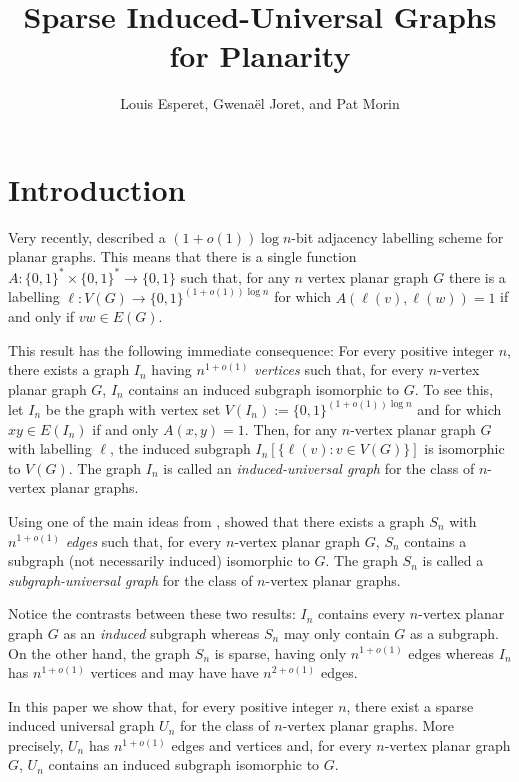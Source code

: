 \documentclass{patmorin}
\title{Sparse Induced-Universal Graphs for Planarity}
\author{Louis Esperet, Gwenaël Joret, and Pat Morin}
\begin{document}
\maketitle

\section{Introduction}

Very recently, \citet{dujmovic.esperet.ea:adjacency} described a $(1+o(1))\log n$-bit adjacency labelling scheme for planar graphs.  This means that there is a single function $A:\{0,1\}^*\times\{0,1\}^* \to\{0,1\}$ such that, for any $n$ vertex planar graph $G$ there is a labelling $\ell:V(G)\to\{0,1\}^{(1+o(1))\log n}$ for which $A(\ell(v),\ell(w))=1$ if and only if $vw\in E(G)$.

This result has the following immediate consequence: For every positive integer $n$, there exists a graph $I_n$ having $n^{1+o(1)}$ \emph{vertices} such that, for every $n$-vertex planar graph $G$, $I_n$ contains an induced subgraph isomorphic to $G$.  To see this, let $I_n$ be the graph with vertex set $V(I_n):=\{0,1\}^{(1+o(1))\log n}$ and for which $xy\in E(I_n)$ if and only $A(x,y)=1$.  Then, for any $n$-vertex planar graph $G$ with labelling $\ell$, the induced subgraph $I_n[\{\ell(v):v\in V(G)\}]$ is isomorphic to $V(G)$.
The graph $I_n$ is called an \emph{induced-universal graph} for the class of $n$-vertex planar graphs.

Using one of the main ideas from \cite{dujmovic.esperet.ea:adjacency}, \citet{esperet.joret.ea:sparse} showed that there exists a graph $S_n$ with $n^{1+o(1)}$ \emph{edges} such that, for every $n$-vertex planar graph $G$, $S_n$ contains a subgraph (not necessarily induced) isomorphic to $G$.  The graph $S_n$ is called a \emph{subgraph-universal graph} for the class of $n$-vertex planar graphs.

Notice the contrasts between these two results: $I_n$ contains every $n$-vertex planar graph $G$ as an \emph{induced} subgraph whereas $S_n$ may only contain $G$ as a subgraph.  On the other hand, the graph $S_n$ is sparse, having only $n^{1+o(1)}$ edges whereas $I_n$ has $n^{1+o(1)}$ vertices and may have have $n^{2+o(1)}$ edges.

In this paper we show that, for every positive integer $n$, there exist a sparse induced universal graph $U_n$ for the class of $n$-vertex planar graphs.  More precisely, $U_n$ has $n^{1+o(1)}$ edges and vertices and, for every $n$-vertex planar graph $G$, $U_n$ contains an induced subgraph isomorphic to $G$.
\end{document}
